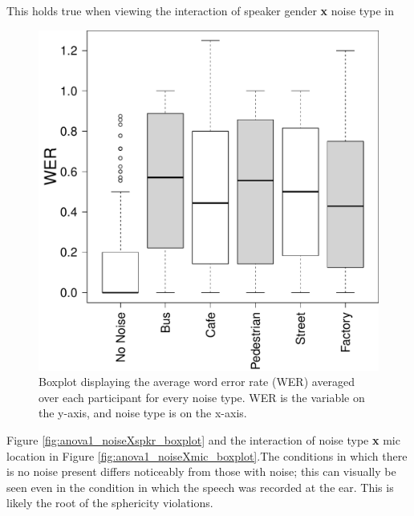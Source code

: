 \documentclass[dissertation,copyright]{uathesis}
\makeatletter
\def\maxwidth{ %
  \ifdim\Gin@nat@width>\linewidth
    \linewidth
  \else
    \Gin@nat@width
  \fi
}
\makeatother
\begin{document}
This holds true when viewing the interaction of speaker gender \textbf{x} noise type in 
%
\begin{figure}

\includegraphics[width=\maxwidth]{figure/boxplot_noise-1} 

\caption{Boxplot displaying the average word error rate (WER) averaged over each participant for every noise type. WER is the variable on the y-axis, and noise type is on the x-axis.}
\label{fig:anova1_noise_boxplot}
\end{figure}
%
Figure \ref{fig:anova1_noiseXspkr_boxplot} and the interaction of noise type \textbf{x} mic location in Figure \ref{fig:anova1_noiseXmic_boxplot}.The conditions in which there is no noise present differs noticeably from those with noise; this can visually be seen even in the condition in which the speech was recorded at the ear. This is likely the root of the sphericity violations.
\end{document}
